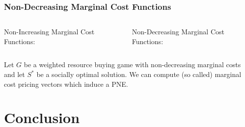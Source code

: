 \documentclass{beamer}
\begin{document}
\begin{frame}
  \frametitle{Non-Decreasing Marginal Cost Functions}
  \begin{columns}
      Non-Increasing Marginal Cost Functions:
      \begin{center}
      \end{center}
      Non-Decreasing Marginal Cost Functions:
      \begin{center}
      \end{center}
  \end{columns}
  \begin{theorem}
    Let $G$ be a weighted resource buying game with non-decreasing marginal
    costs and let $S^{\ast}$ be a socially optimal solution. We can compute
    (so called) marginal cost pricing vectors which induce a PNE.
  \end{theorem}
\end{frame}

\section{Conclusion}
\begin{frame}
\end{frame}
\end{document}
